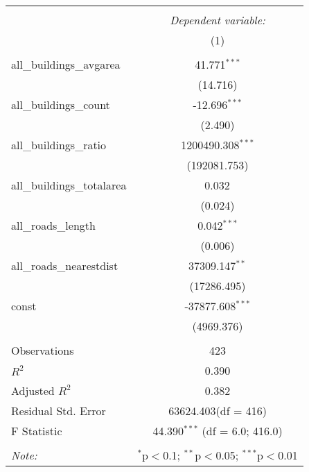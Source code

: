 \begin{table}[!htbp] \centering
\begin{tabular}{@{\extracolsep{5pt}}lc}
\\[-1.8ex]\hline
\hline \\[-1.8ex]
& \multicolumn{1}{c}{\textit{Dependent variable:}} \
\cr \cline{1-2}
\\[-1.8ex] & (1) \\
\hline \\[-1.8ex]
 all_buildings_avgarea & 41.771$^{***}$ \\
  & (14.716) \\
 all_buildings_count & -12.696$^{***}$ \\
  & (2.490) \\
 all_buildings_ratio & 1200490.308$^{***}$ \\
  & (192081.753) \\
 all_buildings_totalarea & 0.032$^{}$ \\
  & (0.024) \\
 all_roads_length & 0.042$^{***}$ \\
  & (0.006) \\
 all_roads_nearestdist & 37309.147$^{**}$ \\
  & (17286.495) \\
 const & -37877.608$^{***}$ \\
  & (4969.376) \\
\hline \\[-1.8ex]
 Observations & 423 \\
 $R^2$ & 0.390 \\
 Adjusted $R^2$ & 0.382 \\
 Residual Std. Error & 63624.403(df = 416)  \\
 F Statistic & 44.390$^{***}$ (df = 6.0; 416.0) \\
\hline
\hline \\[-1.8ex]
\textit{Note:} & \multicolumn{1}{r}{$^{*}$p$<$0.1; $^{**}$p$<$0.05; $^{***}$p$<$0.01} \\
\end{tabular}
\end{table}